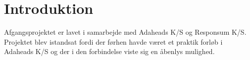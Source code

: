 \chapter*{Introduktion}
Afgangsprojektet er lavet i samarbejde med Adaheads K/S og Responsum K/S. 
Projektet blev istandsat fordi der førhen havde været et praktik forløb i Adaheads K/S og der i den forbindelse viste sig en åbenlys mulighed.
